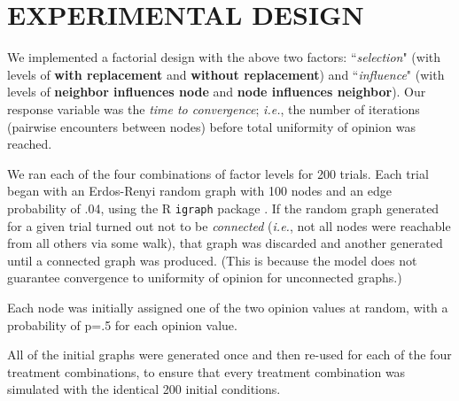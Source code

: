 
\section{EXPERIMENTAL DESIGN}

We implemented a factorial design with the above two factors:
``\textsl{selection}" (with levels of \textbf{with replacement} and
\textbf{without replacement}) and ``\textsl{influence}" (with levels of
\textbf{neighbor influences node} and \textbf{node influences neighbor}). Our
response variable was the \textsl{time to convergence}; \textit{i.e.}, the
number of iterations (pairwise encounters between nodes) before total
uniformity of opinion was reached.

We ran each of the four combinations of factor levels for 200 trials. Each
trial began with an Erdos-Renyi random graph \cite{erdos_random_1959} with 100
nodes and an edge probability of .04, using the R \texttt{igraph} package
\cite{igraph}. If the random graph generated for a given trial turned out not
to be \textit{connected} (\textit{i.e.}, not all nodes were reachable from all
others via some walk), that graph was discarded and another generated until a
connected graph was produced. (This is because the model does not guarantee
convergence to uniformity of opinion for unconnected graphs.)

Each node was initially assigned one of the two opinion values at random, with
a probability of p=.5 for each opinion value. 

All of the initial graphs were generated once and then re-used for each of the
four treatment combinations, to ensure that every treatment combination was
simulated with the identical 200 initial conditions.

